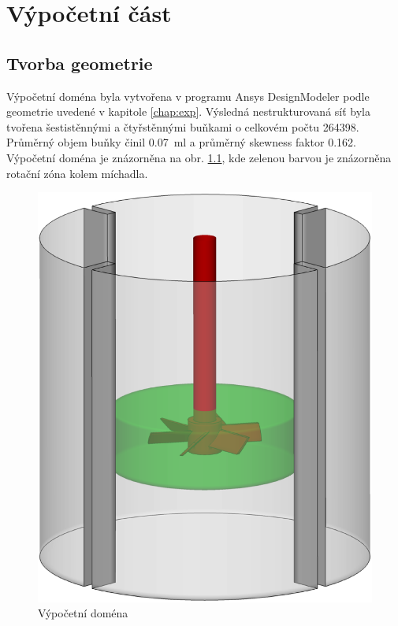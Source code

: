 \chapter{Výpočetní část}

\section{Tvorba geometrie}

Výpočetní doména byla vytvořena v programu Ansys DesignModeler podle geometrie uvedené v kapitole \ref{chap:exp}. Výsledná nestrukturovaná síť byla tvořena šestistěnnými a čtyřstěnnými buňkami o celkovém počtu \num{264398}. Průměrný objem buňky činil \SI{0.07}{\milli\litre} a průměrný skewness faktor \num{0.162}. Výpočetní doména je znázorněna na obr. \ref{fig:geo}, kde zelenou barvou je znázorněna rotační zóna kolem míchadla. 

\begin{figure}[h!]
\begin{center}
\includegraphics[scale=0.28]{images/geo.eps}
\caption{Výpočetní doména}
\label{fig:geo}
\end{center}
\end{figure} 


